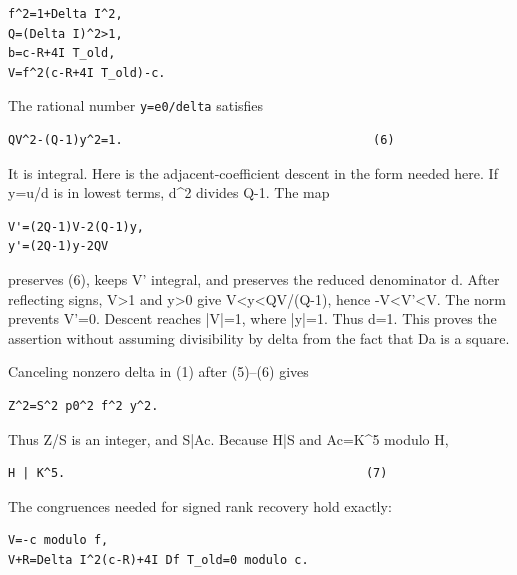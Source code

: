 \begin{verbatim}
f^2=1+Delta I^2,
Q=(Delta I)^2>1,
b=c-R+4I T_old,
V=f^2(c-R+4I T_old)-c.
\end{verbatim}

The rational number \texttt{y=\allowbreak{}e0/\allowbreak{}delta} satisfies



\begin{verbatim}
QV^2-(Q-1)y^2=1.                                   (6)
\end{verbatim}

It is integral. Here is the adjacent-coefficient descent in the form needed here. If y=\allowbreak{}u/\allowbreak{}d is in lowest terms, d\textasciicircum{}\allowbreak{}2 divides Q-1. The map



\begin{verbatim}
V'=(2Q-1)V-2(Q-1)y,
y'=(2Q-1)y-2QV
\end{verbatim}

preserves (6), keeps V' integral, and preserves the reduced denominator d. After reflecting signs, V\textgreater{}\allowbreak{}1 and y\textgreater{}\allowbreak{}0 give V\textless{}\allowbreak{}y\textless{}\allowbreak{}QV/\allowbreak{}(Q-1), hence -V\textless{}\allowbreak{}V'\textless{}\allowbreak{}V. The norm prevents V'=\allowbreak{}0. Descent reaches |V|=\allowbreak{}1, where |y|=\allowbreak{}1. Thus d=\allowbreak{}1. This proves the assertion without assuming divisibility by delta from the fact that Da is a square.



Canceling nonzero delta in (1) after (5)--(6) gives



\begin{verbatim}
Z^2=S^2 p0^2 f^2 y^2.
\end{verbatim}

Thus Z/\allowbreak{}S is an integer, and S|Ac. Because H|S and Ac=\allowbreak{}K\textasciicircum{}\allowbreak{}5 modulo H,



\begin{verbatim}
H | K^5.                                          (7)
\end{verbatim}

The congruences needed for signed rank recovery hold exactly:



\begin{verbatim}
V=-c modulo f,
V+R=Delta I^2(c-R)+4I Df T_old=0 modulo c.
\end{verbatim}

